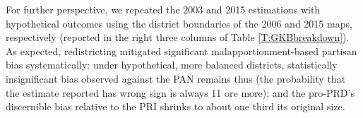 \documentclass[letter,12pt]{article}
\begin{document}
{For further perspective, we repeated the 2003 and 2015 estimations with hypothetical outcomes using the district boundaries of the 2006 and 2015 maps, respectively (reported in the right three columns of Table \ref{T:GKBbreakdown}). As expected, redistricting mitigated significant malapportionment-based partisan bias systematically: under hypothetical, more balanced districts, statistically insignificant bias observed against the PAN remains thus (the probability that the estimate reported has wrong sign is always 11 ore more); and the pro-PRD's discernible bias relative to the PRI shrinks to about one third its original size.  


}
\end{document}
